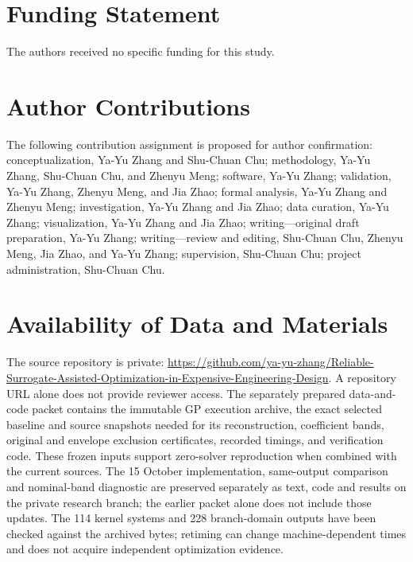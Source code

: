 \documentclass[]{interact}
\begin{document}
\section*{Funding Statement}

The authors received no specific funding for this study.

\section*{Author Contributions}

The following contribution assignment is proposed for author confirmation: conceptualization, Ya-Yu Zhang and Shu-Chuan Chu; methodology, Ya-Yu Zhang, Shu-Chuan Chu, and Zhenyu Meng; software, Ya-Yu Zhang; validation, Ya-Yu Zhang, Zhenyu Meng, and Jia Zhao; formal analysis, Ya-Yu Zhang and Zhenyu Meng; investigation, Ya-Yu Zhang and Jia Zhao; data curation, Ya-Yu Zhang; visualization, Ya-Yu Zhang and Jia Zhao; writing---original draft preparation, Ya-Yu Zhang; writing---review and editing, Shu-Chuan Chu, Zhenyu Meng, Jia Zhao, and Ya-Yu Zhang; supervision, Shu-Chuan Chu; project administration, Shu-Chuan Chu.

\section*{Availability of Data and Materials}

The source repository is private: \url{https://github.com/ya-yu-zhang/Reliable-Surrogate-Assisted-Optimization-in-Expensive-Engineering-Design}. A repository URL alone does not provide reviewer access. The separately prepared data-and-code packet contains the immutable GP execution archive, the exact selected baseline and source snapshots needed for its reconstruction, coefficient bands, original and envelope exclusion certificates, recorded timings, and verification code. These frozen inputs support zero-solver reproduction when combined with the current sources. The 15 October implementation, same-output comparison and nominal-band diagnostic are preserved separately as text, code and results on the private research branch; the earlier packet alone does not include those updates. The 114 kernel systems and 228 branch-domain outputs have been checked against the archived bytes; retiming can change machine-dependent times and does not acquire independent optimization evidence.
\end{document}
